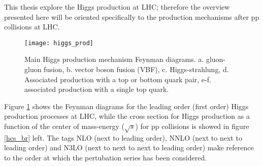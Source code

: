 \noindent This thesis explore the Higgs production at LHC; therefore the overview presented here will be oriented specifically to the production mechanisms after pp collisions at LHC.

\begin{figure}[!h]
\centering
\texttt{[image: higgs\_prod]}
\caption[Higgs production mechanism Feynman diagrams]{Main Higgs production mechanism Feynman diagrams. a. gluon-gluon fusion, b. vector boson fusion (VBF), c. Higgs-strahlung, d. Associated production with a top or bottom quark pair, e-f. associated production with a single top quark.}
\label{higgs_prod}
\end{figure}

\noindent Figure \ref{higgs_prod} shows the Feynman diagrams for the leading order (first order) Higgs production processes at LHC, while the cross section for Higgs production as a function of the center of mass-energy ($\sqrt{s}$) for pp collisions is showed in figure \ref{hcs_br} left. The tags NLO (next to leading order), NNLO (next to next to leading order) and N3LO (next to next to next to leading order) make reference to the order at which the pertubation series has been considered.

